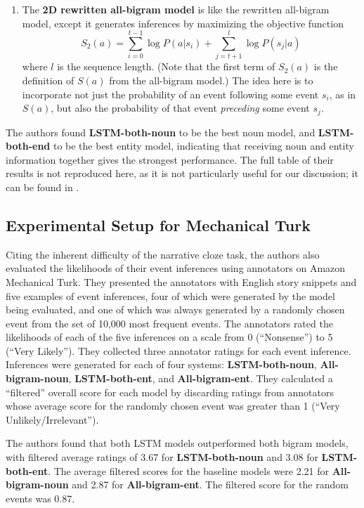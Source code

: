 \begin{enumerate}
    \item The \textbf{2D rewritten all-bigram model} is like the rewritten all-bigram model, except it generates inferences by maximizing the objective function $$S_{2}(a) = \sum\limits_{i=0}^{t-1} \log P(a|s_{i}) + \sum\limits_{j=t+1}^{l} \log P(s_{j}|a)$$ where $l$ is the sequence length. (Note that the first term of $S_{2}(a)$ is the definition of $S(a)$ from the all-bigram model.) The idea here is to incorporate not just the probability of an event following some event $s_{i}$, as in $S(a)$, but also the probability of that event \textit{preceding} some event $s_{j}$.
\end{enumerate}

The authors found \textbf{LSTM-both-noun} to be the best noun model, and \textbf{LSTM-both-end} to be the best entity model, indicating that receiving noun and entity information together gives the strongest performance. The full table of their results is not reproduced here, as it is not particularly useful for our discussion; it can be found in \citep{pichotta2016learning}.

\subsection{Experimental Setup for Mechanical Turk}
Citing the inherent difficulty of the narrative cloze task, the authors also evaluated the likelihoods of their event inferences using annotators on Amazon Mechanical Turk. They presented the annotators with English story snippets and five examples of event inferences, four of which were generated by the model being evaluated, and one of which was always generated by a randomly chosen event from the set of 10,000 most frequent events. The annotators rated the likelihoods of each of the five inferences on a scale from 0 (``Nonsense'') to 5 (``Very Likely''). They collected three annotator ratings for each event inference. Inferences were generated for each of four systems: \textbf{LSTM-both-noun}, \textbf{All-bigram-noun}, \textbf{LSTM-both-ent}, and \textbf{All-bigram-ent}. They calculated a ``filtered'' overall score for each model by discarding ratings from annotators whose average score for the randomly chosen event was greater than 1 (``Very Unlikely/Irrelevant'').

The authors found that both LSTM models outperformed both bigram models, with filtered average ratings of 3.67 for \textbf{LSTM-both-noun} and 3.08 for \textbf{LSTM-both-ent}. The average filtered scores for the baseline models were 2.21 for \textbf{All-bigram-noun} and 2.87 for \textbf{All-bigram-ent}. The filtered score for the random events was 0.87.

